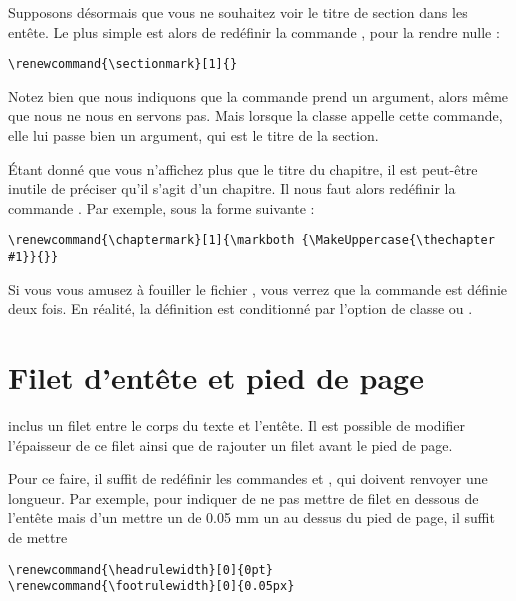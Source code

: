 Supposons désormais que vous ne souhaitez voir le titre de section dans les entête. Le plus simple est alors de redéfinir la commande , pour la rendre nulle :

\begin{verbatim}
\renewcommand{\sectionmark}[1]{}
\end{verbatim}

\begin{attention}
Notez bien que nous indiquons que la commande  prend un argument, alors même que nous ne nous en servons pas. Mais lorsque la classe  appelle cette commande, elle lui passe bien un argument, qui est le titre de la section.
\end{attention}

Étant donné que vous n'affichez plus que le titre du chapitre, il est peut-être inutile de préciser qu'il s'agit d'un chapitre. Il nous faut alors redéfinir la commande . Par exemple, sous la forme suivante :

\begin{verbatim}
\renewcommand{\chaptermark}[1]{\markboth {\MakeUppercase{\thechapter #1}}{}}
\end{verbatim}

\begin{anedocte}
Si vous vous amusez à fouiller le fichier , vous verrez que la commande  est définie deux fois. En réalité, la définition est conditionné par l'option de classe  ou .
\end{anedocte}
\section{Filet d'entête et pied de page}

 inclus un filet entre le corps du texte et l'entête. Il est possible de modifier l'épaisseur de ce filet ainsi que de rajouter un filet avant le  pied de page.

Pour ce faire, il suffit de redéfinir les commandes  et , qui doivent renvoyer une longueur.
Par exemple, pour indiquer de ne pas mettre de filet en dessous de l'entête mais d'un mettre un de 0.05 mm un au dessus du pied de page, il suffit de mettre 
\begin{verbatim}
\renewcommand{\headrulewidth}[0]{0pt}
\renewcommand{\footrulewidth}[0]{0.05px}

\end{verbatim}
